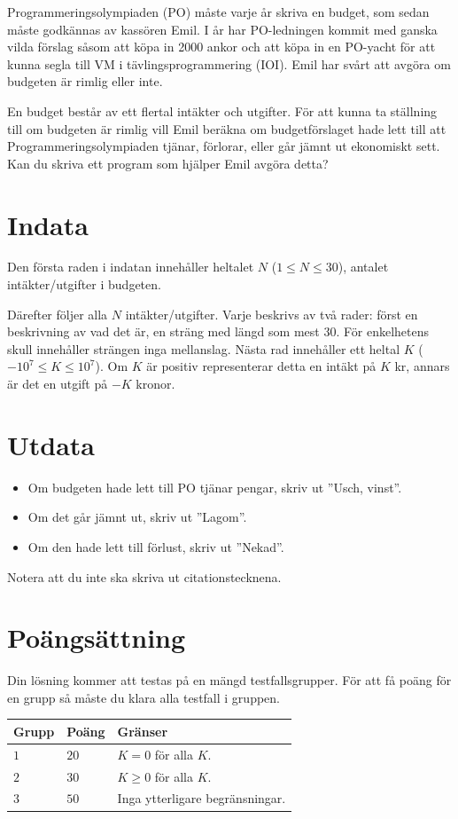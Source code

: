 Programmeringsolympiaden (PO) måste varje år skriva en budget, som sedan måste godkännas av kassören Emil.
I år har PO-ledningen kommit med ganska vilda förslag såsom att köpa in 2000 ankor och att köpa in en PO-yacht för
att kunna segla till VM i tävlingsprogrammering (IOI). Emil har svårt att avgöra om budgeten är rimlig eller inte.

En budget består av ett flertal intäkter och utgifter. 
För att kunna ta ställning till om budgeten är rimlig vill Emil beräkna om budgetförslaget hade lett till
att Programmeringsolympiaden tjänar, förlorar, eller går jämnt ut ekonomiskt sett. Kan du skriva ett program
som hjälper Emil avgöra detta?

\section*{Indata}
Den första raden i indatan innehåller heltalet $N$ ($1 \leq N \leq 30$), antalet intäkter/utgifter i budgeten.

Därefter följer alla $N$ intäkter/utgifter. Varje beskrivs av två rader: först en beskrivning av vad det är, en
sträng med längd som mest $30$. För enkelhetens skull innehåller strängen inga mellanslag.
Nästa rad innehåller ett heltal $K$ ($-10^7 \leq K \leq 10^7$). Om $K$ är positiv
representerar detta en intäkt på $K$ kr, annars är det en utgift på $-K$ kronor.

\section*{Utdata}
\begin{itemize}
  \item Om budgeten hade lett till PO tjänar pengar, skriv ut ''Usch, vinst''.
  \item Om det går jämnt ut, skriv ut ''Lagom''.
  \item Om den hade lett till förlust, skriv ut ''Nekad''.
\end{itemize}
Notera att du inte ska skriva ut citationstecknena.

\section*{Poängsättning}
Din lösning kommer att testas på en mängd testfallsgrupper.
För att få poäng för en grupp så måste du klara alla testfall i gruppen.

\noindent
\begin{tabular}{| l | l | p{12cm} |}
  \hline
  \textbf{Grupp} & \textbf{Poäng} & \textbf{Gränser} \\ \hline
  $1$    & $20$       & $K = 0$ för alla $K$. \\ \hline 
  $2$    & $30$       & $K \geq 0$ för alla $K$. \\ \hline
  $3$    & $50$       & Inga ytterligare begränsningar. \\ \hline
\end{tabular}


